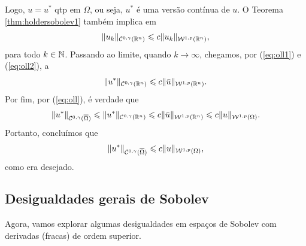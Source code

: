 \begin{prf}
    Logo, $u = u^*$ qtp em $\Omega$, ou seja, $u^*$ é uma versão contínua de $u$.
    O Teorema \ref{thm:holdersobolev1} também implica em
    \[
        \Vert u_k \Vert_{\mathcal{C}^{0,\gamma}(\mathbb{R}^n)} \leqslant c \Vert u_k \Vert_{\mathcal{W}^{1,p}(\mathbb{R}^n)},
    \]
    para todo $k \in \mathbb{N}$.
    Passando ao limite, quando $k \to \infty$, chegamos, por (\ref{eq:oll1}) e (\ref{eq:oll2}), a
    \[
        \Vert u^* \Vert_{\mathcal{C}^{0,\gamma}(\mathbb{R}^n)} \leqslant c \Vert \bar u \Vert_{\mathcal{W}^{1,p}(\mathbb{R}^n)}.
    \]
    Por fim, por (\ref{eq:oll}), é verdade que
    \[
        \Vert u^* \Vert_{\mathcal{C}^{0,\gamma}(\overline \Omega)} \leqslant \Vert u^* \Vert_{\mathcal{C}^{0,\gamma}(\mathbb{R}^n)} \leqslant c \Vert \bar u \Vert_{\mathcal{W}^{1,p}(\mathbb{R}^n)} \leqslant c \Vert u \Vert_{\mathcal{W}^{1,p}(\Omega)}.
    \]
    Portanto, concluímos que
    \[
        \Vert u^* \Vert_{\mathcal{C}^{0,\gamma}(\overline\Omega)} \leqslant c \Vert u \Vert_{\mathcal{W}^{1,p}(\Omega)},
    \]
    como era desejado.
\end{prf}

\subsection{Desigualdades gerais de Sobolev}

Agora, vamos explorar algumas desigualdades em espaços de Sobolev com derivadas (fracas) de ordem superior.


